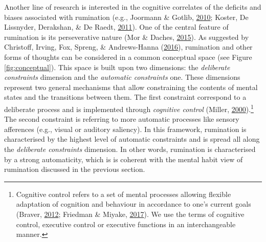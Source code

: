 \documentclass[a4paper,12pt,twoside,onecolumn,openright,final,oldfontcommands]{memoir}
\let\rmarkdownfootnote\footnote%
\def\footnote{\protect\rmarkdownfootnote}
\begin{document}
Another line of research is interested in the cognitive correlates of the deficits and biases associated with rumination (e.g., Joormann \& Gotlib, \protect\hyperlink{ref-joormann_emotion_2010}{2010}; Koster, De Lissnyder, Derakshan, \& De Raedt, \protect\hyperlink{ref-Koster2011}{2011}). One of the central feature of rumination is its perseverative nature (Mor \& Daches, \protect\hyperlink{ref-mor_ruminative_2015}{2015}). As suggested by Christoff, Irving, Fox, Spreng, \& Andrews-Hanna (\protect\hyperlink{ref-christoff_mind-wandering_2016}{2016}), rumination and other forms of thoughts can be considered in a common conceptual space (see Figure \ref{fig:conceptual}). This space is built upon two dimensions: the \emph{deliberate constraints} dimension and the \emph{automatic constraints} one. These dimensions represent two general mechanisms that allow constraining the contents of mental states and the transitions between them. The first constraint correspond to a deliberate process and is implemented through \emph{cognitive control} (Miller, \protect\hyperlink{ref-miller_prefontral_2000}{2000}).\footnote{Cognitive control refers to a set of mental processes allowing flexible adaptation of cognition and behaviour in accordance to one's current goals (Braver, \protect\hyperlink{ref-braver_variable_2012}{2012}; Friedman \& Miyake, \protect\hyperlink{ref-friedman_unity_2017}{2017}). We use the terms of cognitive control, executive control or executive functions in an interchangeable manner.} The second constraint is referring to more automatic processes like sensory afferences (e.g., visual or auditory saliency). In this framework, rumination is characterised by the highest level of automatic constraints and is spread all along the \emph{deliberate constraints} dimension. In other words, rumination is characterised by a strong automaticity, which is is coherent with the mental habit view of rumination discussed in the previous section.
\end{document}

